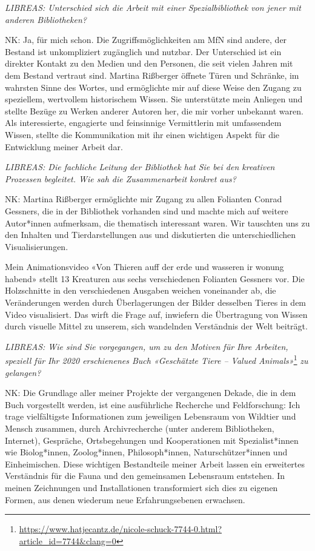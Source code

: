 \documentclass[a4paper,
fontsize=11pt,
oneside,
numbers=noperiodatend,
parskip=half-,
bibliography=totoc,
final
]{scrartcl}
\begin{document}
\emph{LIBREAS: Unterschied sich die Arbeit mit einer Spezialbibliothek
von jener mit anderen Bibliotheken?}

NK: Ja, für mich schon. Die Zugriffsmöglichkeiten am MfN sind andere,
der Bestand ist unkompliziert zugänglich und nutzbar. Der Unterschied
ist ein direkter Kontakt zu den Medien und den Personen, die seit vielen
Jahren mit dem Bestand vertraut sind. Martina Rißberger öffnete Türen
und Schränke, im wahrsten Sinne des Wortes, und ermöglichte mir auf
diese Weise den Zugang zu speziellem, wertvollem historischem Wissen.
Sie unterstützte mein Anliegen und stellte Bezüge zu Werken anderer
Autoren her, die mir vorher unbekannt waren. Als interessierte,
engagierte und feinsinnige Vermittlerin mit umfassendem Wissen, stellte
die Kommunikation mit ihr einen wichtigen Aspekt für die Entwicklung
meiner Arbeit dar.

\emph{LIBREAS: Die fachliche Leitung der Bibliothek hat Sie bei den
kreativen Prozessen begleitet. Wie sah die Zusammenarbeit konkret aus?}

NK: Martina Rißberger ermöglichte mir Zugang zu allen Folianten Conrad
Gessners, die in der Bibliothek vorhanden sind und machte mich auf
weitere Autor*innen aufmerksam, die thematisch interessant waren. Wir
tauschten uns zu den Inhalten und Tierdarstellungen aus und diskutierten
die unterschiedlichen Visualisierungen.

Mein Animationsvideo «Von Thieren auff der erde und wasseren ir wonung
habend» stellt 13 Kreaturen aus sechs verschiedenen Folianten Gessners
vor. Die Holzschnitte in den verschiedenen Ausgaben weichen voneinander
ab, die Veränderungen werden durch Überlagerungen der Bilder desselben
Tieres in dem Video visualisiert. Das wirft die Frage auf, inwiefern die
Übertragung von Wissen durch visuelle Mittel zu unserem, sich wandelnden
Verständnis der Welt beiträgt.

\emph{LIBREAS: Wie sind Sie vorgegangen, um zu den Motiven für Ihre
Arbeiten, speziell für Ihr 2020 erschienenes Buch «Geschätzte Tiere --
Valued Animals»}\footnote{\url{https://www.hatjecantz.de/nicole-schuck-7744-0.html?article_id=7744\&clang=0}}
\emph{zu gelangen?}

NK: Die Grundlage aller meiner Projekte der vergangenen Dekade, die in
dem Buch vorgestellt werden, ist eine ausführliche Recherche und
Feldforschung: Ich trage vielfältigste Informationen zum jeweiligen
Lebensraum von Wildtier und Mensch zusammen, durch Archivrecherche
(unter anderem Bibliotheken, Internet), Gespräche, Ortsbegehungen und
Kooperationen mit Spezialist*innen wie Biolog*innen, Zoolog*innen,
Philosoph*innen, Naturschützer*innen und Einheimischen. Diese wichtigen
Bestandteile meiner Arbeit lassen ein erweitertes Verständnis für die
Fauna und den gemeinsamen Lebensraum entstehen. In meinen Zeichnungen
und Installationen transformiert sich dies zu eigenen Formen, aus denen
wiederum neue Erfahrungsebenen erwachsen.
\end{document}
